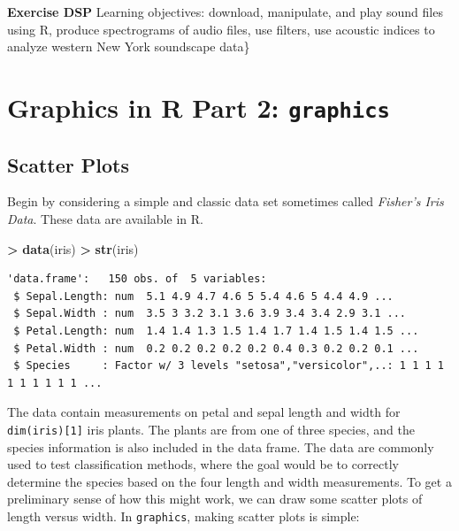 \documentclass[]{krantz}
\makeatletter
\newenvironment{Shaded}{\begin{snugshade}}{\end{snugshade}}
\newcommand{\KeywordTok}[1]{\textcolor[rgb]{0.27,0.27,0.27}{\textbf{#1}}}
\newcommand{\DataTypeTok}[1]{\textcolor[rgb]{0.27,0.27,0.27}{#1}}
\newcommand{\StringTok}[1]{\textcolor[rgb]{0.5,0.5,0.5}{#1}}
\newcommand{\OperatorTok}[1]{\textcolor[rgb]{0.43,0.43,0.43}{\textbf{#1}}}
\newcommand{\NormalTok}[1]{#1}
\newenvironment{kframe}{%
\medskip{}
\setlength{\fboxsep}{.8em}
 \def\at@end@of@kframe{}%
 \ifinner\ifhmode%
  \def\at@end@of@kframe{\end{minipage}}%
  \begin{minipage}{\columnwidth}%
 \fi\fi%
 \def\FrameCommand##1{\hskip\@totalleftmargin \hskip-\fboxsep
 \colorbox{shadecolor}{##1}\hskip-\fboxsep
     \hskip-\linewidth \hskip-\@totalleftmargin \hskip\columnwidth}%
 \MakeFramed {\advance\hsize-\width
   \@totalleftmargin\z@ \linewidth\hsize
   \@setminipage}}%
 {\par\unskip\endMakeFramed%
 \at@end@of@kframe}
\renewenvironment{Shaded}{\begin{kframe}}{\end{kframe}}
\makeatother
\begin{document}
\textbf{Exercise DSP} Learning objectives: download, manipulate, and
play sound files using R, produce spectrograms of audio files, use
filters, use acoustic indices to analyze western New York soundscape
data\}

\chapter{\texorpdfstring{Graphics in R Part 2:
\texttt{graphics}}{Graphics in R Part 2: graphics}}\label{graphics}

\section{Scatter Plots}\label{scatter-plots-1}

Begin by considering a simple and classic data set sometimes called
\emph{Fisher's Iris Data}. These data are available in R.

\begin{Shaded}
\begin{Highlighting}[]
\OperatorTok{>}\StringTok{ }\KeywordTok{data}\NormalTok{(iris)}
\OperatorTok{>}\StringTok{ }\KeywordTok{str}\NormalTok{(iris)}
\end{Highlighting}
\end{Shaded}

\begin{verbatim}
'data.frame':   150 obs. of  5 variables:
 $ Sepal.Length: num  5.1 4.9 4.7 4.6 5 5.4 4.6 5 4.4 4.9 ...
 $ Sepal.Width : num  3.5 3 3.2 3.1 3.6 3.9 3.4 3.4 2.9 3.1 ...
 $ Petal.Length: num  1.4 1.4 1.3 1.5 1.4 1.7 1.4 1.5 1.4 1.5 ...
 $ Petal.Width : num  0.2 0.2 0.2 0.2 0.2 0.4 0.3 0.2 0.2 0.1 ...
 $ Species     : Factor w/ 3 levels "setosa","versicolor",..: 1 1 1 1 1 1 1 1 1 1 ...
\end{verbatim}

The data contain measurements on petal and sepal length and width for
\texttt{dim(iris){[}1{]}} iris plants. The plants are from one of three
species, and the species information is also included in the data frame.
The data are commonly used to test classification methods, where the
goal would be to correctly determine the species based on the four
length and width measurements. To get a preliminary sense of how this
might work, we can draw some scatter plots of length versus width. In
\texttt{graphics}, making scatter plots is simple:

\begin{Shaded}
\end{Shaded}
\end{document}

